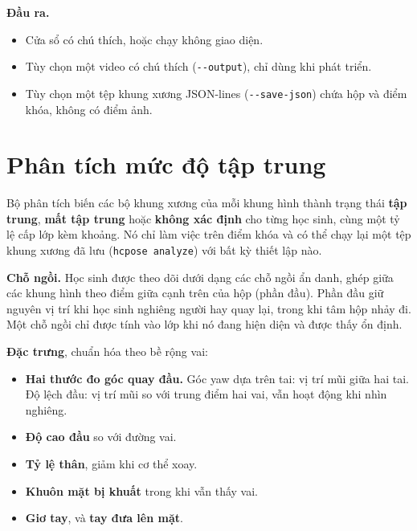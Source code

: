 
\textbf{Đầu ra.}

\begin{itemize}
\tightlist
\item
  Cửa sổ có chú thích, hoặc chạy không giao diện.
\item
  Tùy chọn một video có chú thích (\texttt{-\/-output}), chỉ dùng khi phát triển.
\item
  Tùy chọn một tệp khung xương JSON-lines (\texttt{-\/-save-json}) chứa hộp và điểm khóa, không có điểm ảnh.
\end{itemize}


\section{Phân tích mức độ tập trung}

Bộ phân tích biến các bộ khung xương của mỗi khung hình thành trạng thái \textbf{tập trung}, \textbf{mất tập trung} hoặc \textbf{không xác định} cho từng học sinh, cùng một tỷ lệ cấp lớp kèm khoảng. Nó chỉ làm việc trên điểm khóa và có thể chạy lại một tệp khung xương đã lưu (\texttt{hcpose\ analyze}) với bất kỳ thiết lập nào.

\textbf{Chỗ ngồi.} Học sinh được theo dõi dưới dạng các chỗ ngồi ẩn danh, ghép giữa các khung hình theo điểm giữa cạnh trên của hộp (phần đầu). Phần đầu giữ nguyên vị trí khi học sinh nghiêng người hay quay lại, trong khi tâm hộp nhảy đi. Một chỗ ngồi chỉ được tính vào lớp khi nó đang hiện diện và được thấy ổn định.

\textbf{Đặc trưng}, chuẩn hóa theo bề rộng vai:

\begin{itemize}
\tightlist
\item
  \textbf{Hai thước đo góc quay đầu.} Góc yaw dựa trên tai: vị trí mũi giữa hai tai. Độ lệch đầu: vị trí mũi so với trung điểm hai vai, vẫn hoạt động khi nhìn nghiêng.
\item
  \textbf{Độ cao đầu} so với đường vai.
\item
  \textbf{Tỷ lệ thân}, giảm khi cơ thể xoay.
\item
  \textbf{Khuôn mặt bị khuất} trong khi vẫn thấy vai.
\item
  \textbf{Giơ tay}, và \textbf{tay đưa lên mặt}.
\end{itemize}

